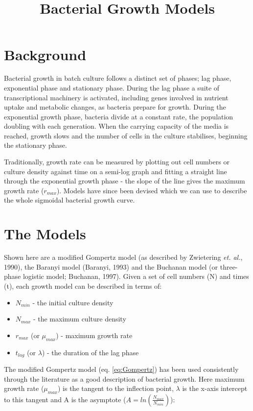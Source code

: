 \documentclass[a4paper]{article}
\title{Bacterial Growth Models}
\date{}
\begin{document}
\maketitle

\section*{Background}

Bacterial growth in batch culture follows a distinct set of phases; lag phase, exponential phase and stationary phase. During the lag phase a suite of transcriptional machinery is activated, including genes involved in nutrient uptake and metabolic changes, as bacteria prepare for growth. During the exponential growth phase, bacteria divide at a constant rate, the population doubling with each generation. When the carrying capacity of the media is reached, growth slows and the number of cells in the culture stabilises, beginning the stationary phase. \

Traditionally, growth rate can be measured by plotting out cell numbers or culture density against time on a semi-log graph and fitting a straight line through the exponential growth phase - the slope of the line gives the maximum growth rate ($r_{max}$). Models have since been devised which we can use to describe the whole sigmoidal bacterial growth curve.  \

\section*{The Models}

Shown here are a modified Gompertz model (as described by Zwietering \textsl{et. al.}, 1990), the Baranyi model (Baranyi, 1993) and the Buchanan model (or three-phase logistic model; Buchanan, 1997). Given a set of cell numbers (N) and times (t), each growth model can be described in terms of:

\begin{itemize}
	\item $N_{min}$ - the initial culture density
	\item $N_{max}$ - the maximum culture density
	\item $r_{max}$ (or $\mu_{max}$) - maximum growth rate
	\item $t_{lag}$ (or $\lambda$) - the duration of the lag phase
\end{itemize} 
	

\noindent The modified Gompertz model (eq. \ref{eq:Gompertz}) has been used consistently through the literature as a good description of bacterial growth. Here maximum growth rate ($\mu_{max}$) is the tangent to the inflection point, $\lambda$ is the x-axis intercept to this tangent and A is the asymptote ($A = ln(\frac{N_{max}}{N_{min}})$):
\end{document}
